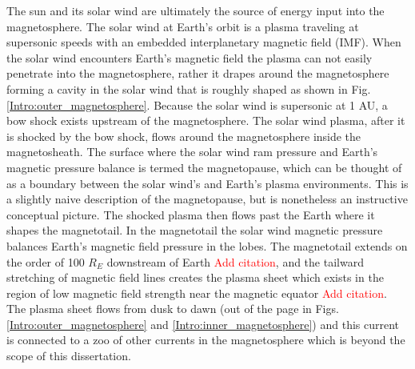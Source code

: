 The sun and its solar wind are ultimately the source of energy input into the magnetosphere. The solar wind at Earth's orbit is a plasma traveling at supersonic speeds with an embedded interplanetary magnetic field (IMF). When the solar wind encounters Earth's magnetic field the plasma can not easily penetrate into the magnetosphere, rather it drapes around the magnetosphere forming a cavity in the solar wind that is roughly shaped as shown in Fig. \ref{Intro:outer_magnetosphere}. Because the solar wind is supersonic at 1 AU, a bow shock exists upstream of the magnetosphere. The solar wind plasma, after it is shocked by the bow shock, flows around the magnetosphere inside the magnetosheath. The surface where the solar wind ram pressure and Earth's magnetic pressure balance is termed the magnetopause, which can be thought of as a boundary between the solar wind's and Earth's plasma environments. This is a slightly naive description of the magnetopause, but is nonetheless an instructive conceptual picture. The shocked plasma then flows past the Earth where it shapes the magnetotail. In the magnetotail the solar wind magnetic pressure balances Earth's magnetic field pressure in the lobes. The magnetotail extends on the order of 100 $R_E$ downstream of Earth \textcolor{red}{Add citation}, and the tailward stretching of magnetic field lines creates the plasma sheet which exists in the region of low magnetic field strength near the magnetic equator \textcolor{red}{Add citation}. The plasma sheet flows from dusk to dawn (out of the page in Figs. \ref{Intro:outer_magnetosphere} and \ref{Intro:inner_magnetosphere}) and this current is connected to a zoo of other currents in the magnetosphere which is beyond the scope of this dissertation.

